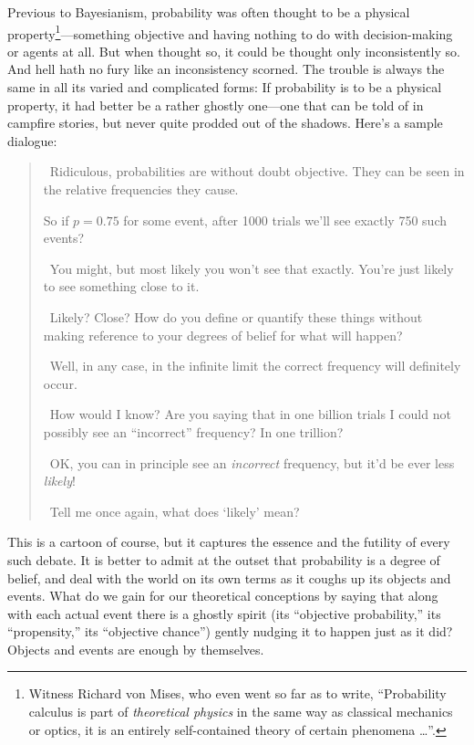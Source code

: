 Previous to  Bayesianism, probability was often thought to be a physical property\footnote{Witness Richard von Mises, who even went so far as to write, ``Probability calculus is part of {\it theoretical physics\/} in the same way as classical mechanics or optics, it is an entirely self-contained theory of certain phenomena \ldots''\cite{Mises22}.}---something objective and having nothing to do with decision-making or agents at all.  But when thought so, it could be thought only inconsistently so.  And hell hath no fury like an inconsistency scorned.
The trouble is always the same in all its varied and complicated forms:  If probability is to be a physical property, it had better be a rather ghostly one---one that can be told of in campfire stories, but never quite prodded out of the shadows.  Here's a sample dialogue:
\begin{quote}
\begin{description}
\small
\item[Pre-Bayesian:]  \ Ridiculous, probabilities are without doubt objective.  They can be seen in the relative frequencies they cause.
\item[Bayesian:]  So if $p=0.75$ for some event, after 1000 trials we'll see exactly 750 such events?
\item[Pre-Bayesian:]  \ You might, but most likely you won't see that exactly.  You're just likely to see something close to it.
\item[Bayesian:]  \ Likely?  Close?  How do you define or quantify these things without making reference to your degrees of belief for what will happen?
\item[Pre-Bayesian:]  \ Well, in any case, in the infinite limit the correct frequency will definitely occur.
\item[Bayesian:]  \ How would I know?  Are you saying that in one billion trials I could not possibly see an ``incorrect'' frequency?  In one trillion?
\item[Pre-Bayesian:]  \ OK, you can in principle see an {\it incorrect\/} frequency, but it'd be ever less {\it likely}!
\item[Bayesian:]  \ Tell me once again, what does `likely' mean?
\end{description}
\end{quote}
This is a cartoon of course, but it captures the essence and the futility of every such debate.  It is better to admit at the outset that probability is a degree of belief, and deal with the world on its own terms as it coughs up its objects and events.  What do we gain for our theoretical conceptions by saying that along with each actual event there is a ghostly spirit (its ``objective probability,'' its ``propensity,'' its ``objective chance'') gently nudging it to happen just as it did?  Objects and events are enough by themselves.

